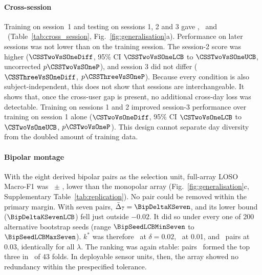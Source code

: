 \paragraph{Cross-session}
Training on session~1 and testing on sessions 1, 2 and 3 gave \CSOneSOne, \CSOneSTwo\ and \CSOneSThree\ (Table~\ref{tab:cross_session}, Fig.~\ref{fig:generalisation}a). Performance on later sessions was not lower than on the training session. The session-2 score was higher ($\CSSTwoVsSOneDiff$, 95\% CI $\CSSTwoVsSOneLCB$ to $\CSSTwoVsSOneUCB$, uncorrected $p \CSSTwoVsSOneP$), and session 3 did not differ ($\CSSThreeVsSOneDiff$, $p \CSSThreeVsSOneP$). Because every condition is also subject-independent, this does not show that sessions are interchangeable. It shows that, once the cross-user gap is present, no additional cross-day loss was detectable. Training on sessions 1 and 2 improved session-3 performance over training on session 1 alone ($\CSTwoVsOneDiff$, 95\% CI $\CSTwoVsOneLCB$ to $\CSTwoVsOneUCB$, $p \CSTwoVsOneP$). This design cannot separate day diversity from the doubled amount of training data.

\paragraph{Bipolar montage}
With the eight derived bipolar pairs as the selection unit, full-array LOSO Macro-F1 was \BipFull\ $\pm$ \BipFullSD, lower than the monopolar array (Fig.~\ref{fig:generalisation}c, Supplementary Table~\ref{tab:replication}). No pair could be removed within the primary margin. With seven pairs, $\bar\Delta_7 = \BipDeltaKSeven$, and its lower bound ($\BipDeltaKSevenLCB$) fell just outside $-0.02$. It did so under every one of 200 alternative bootstrap seeds (range $\BipSeedLCBMinSeven$ to $\BipSeedLCBMaxSeven$). $k^*$ was therefore \BipKStarMarginPtTwo\ at $\delta = 0.02$, \BipKStarMarginPtOne\ at 0.01, and \BipKStarMarginPtThree\ pairs at 0.03, identically for all $\lambda$. The ranking was again stable: pairs \BipTopThreeSet\ formed the top three in \BipTopThreeFolds\ of 43 folds. In deployable sensor units, then, the array showed no redundancy within the prespecified tolerance.

